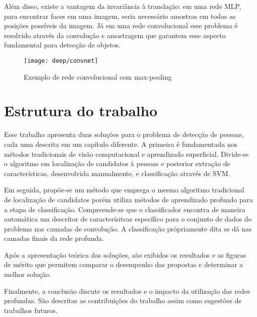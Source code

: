 Além disso, existe a vantagem da invariância à translação: em uma rede MLP, para encontrar faces em uma imagem, seria necessário amostras em todas as posições possíveis da imagem. Já em uma rede convolucional esse problema é resolvido através da convolução e amostragem que garantem esse aspecto fundamental para detecção de objetos.

\begin{figure}
\centering
\texttt{[image: deep/convnet]}
\caption{Exemplo de rede convolucional com max-pooling}
\label{fig:convnet}
\end{figure}

\section{Estrutura do trabalho}
Esse trabalho apresenta duas soluções para o problema de detecção de pessoas, cada uma descrita em um capítulo diferente. A primeira é fundamentada nos métodos tradicionais de visão computacional e aprendizado superficial. Divide-se o algoritmo em localização de candidatos à pessoas e posterior extração de características, desenvolvida manualmente, e classificação através de SVM.

Em seguida, propõe-se um método que emprega o mesmo algoritmo tradicional de localização de candidatos porém utiliza métodos de aprendizado profundo para a etapa de classificação. Compreende-se que o classificador encontra de maneira automática um descritor de caracterísitcas específico para o conjunto de dados do problema nas camadas de convolução. A classificação própriamente dita se dá nas camadas finais da rede profunda.

Após a apresentação teórica das soluções, são exibidos os resultados e as figuras de mérito que permitem comparar o desempenho das propostas e determinar a melhor solução.

Finalmente, a conclusão discute os resultados e o impacto da utilização das redes profundas. São descritas as contribuições do trabalho assim como sugestões de trabalhos futuros.



